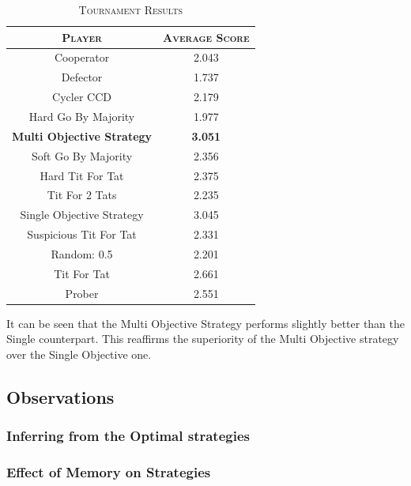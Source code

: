 \documentclass[a4paper]{article}
\begin{document}
	\begin{table}[H]
	  \begin{center}
	    \begin{tabular}{c|c}
	      \toprule
	      \textsc{Player} & \textsc{Average Score}\\
	      \midrule
			Cooperator & 2.043\\
			Defector & 1.737\\
			Cycler CCD & 2.179\\
			Hard Go By Majority & 1.977\\
			\textbf{Multi Objective Strategy} & \textbf{3.051}\\
			Soft Go By Majority & 2.356\\
			Hard Tit For Tat & 2.375\\
			Tit For 2 Tats & 2.235\\
			{Single Objective Strategy} & {3.045}\\
			Suspicious Tit For Tat & 2.331\\
			Random: 0.5 & 2.201\\
			Tit For Tat & 2.661\\
			Prober & 2.551\\
		  \bottomrule
	    \end{tabular}
	    \caption{\textsc{Tournament Results}}
	  \end{center}
	\end{table}  

	It can be seen that the Multi Objective Strategy performs slightly better than the Single counterpart. This reaffirms the superiority of the Multi Objective strategy over the Single Objective one.
	
	\subsection{Observations}
	
	\subsubsection{Inferring from the Optimal strategies}
	
	\subsubsection{Effect of Memory on Strategies}	
\end{document}
